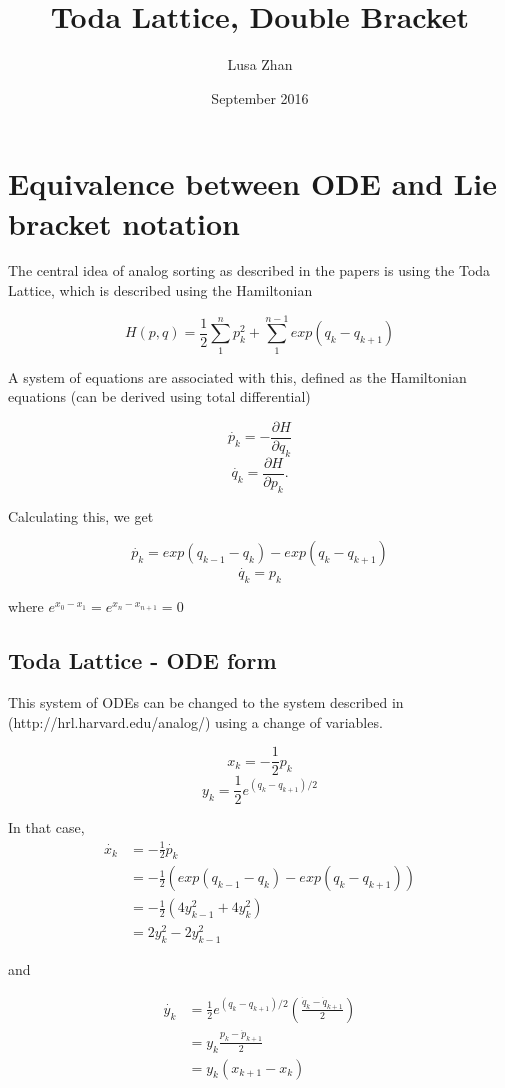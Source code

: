\documentclass{article}
\title{Toda Lattice, Double Bracket}
\author{Lusa Zhan}
\date{September 2016}
\begin{document}
\maketitle


\section{Equivalence between ODE and Lie bracket notation}

The central idea of analog sorting as described in the papers is using the Toda Lattice, which is described using the Hamiltonian

\[ H(p,q) = \frac{1}{2} \sum^{n}_{1}p_k^2 + \sum^{n-1}_{1}exp(q_k-q_{k+1})\]

A system of equations are associated with this, defined as the Hamiltonian equations (can be derived using total differential)

\[\dot{p_k} = -\frac{\partial H}{\partial q_k}\]
\[\dot{q_k} = \frac{\partial H}{\partial p_k}.\]

Calculating this, we get

\[\dot{p_k} = exp(q_{k-1}-q_{k})-exp(q_{k}-q_{k+1}) \]
\[\dot{q_k} = p_k\]

where $e^{x_0-x_1}=e^{x_n-x_{n+1}}=0$

\subsection{Toda Lattice - ODE form}

This system of ODEs can  be changed to the system described in (http://hrl.harvard.edu/analog/) using a change of variables.

\[x_k = -\frac{1}{2}p_k\]
\[y_k = \frac{1}{2}e^{(q_k-q_{k+1})/2}\]

In that case, 
\begin{align*}
    \dot{x_k} &= -\frac{1}{2}\dot{p_k} \\
              &= -\frac{1}{2}(exp(q_{k-1}-q_{k})-exp(q_{k}-q_{k+1})) \\
              &= -\frac{1}{2}(4y^2_{k-1}+4y^2_k) \\
              &= 2y^2_k-2y^2_{k-1}
\end{align*}

and 

\begin{align*}
    \dot{y_k} &= \frac{1}{2}e^{(q_k-q_{k+1})/2}(\frac{\dot q_k-\dot q_{k+1}}{2}) \\
              &= y_k\frac{p_k-\dot p_{k+1}}{2} \\
              &= y_k(x_{k+1}-x_k) 
\end{align*}
\end{document}

